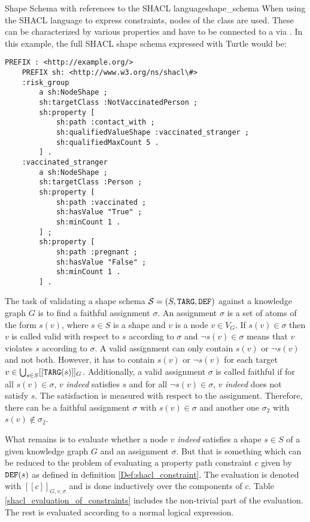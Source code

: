 \begin{Bsp}{Shape Schema with references to the SHACL language}{shape_schema}
When using the SHACL language to express constraints, nodes of the class  are used. These can be characterized by various properties and have to be connected to a  via . In this example, the full SHACL shape schema expressed with Turtle would be:
    \lstset{language=html}
    \begin{lstlisting}[captionpos=b, caption=The Example SHACL Shape Schema Serialized with Turtle , basicstyle=\ttfamily, frame=single]
    PREFIX : <http://example.org/>
    PREFIX sh: <http://www.w3.org/ns/shacl\#>
    :risk_group
        a sh:NodeShape ;
        sh:targetClass :NotVaccinatedPerson ;
        sh:property [
            sh:path :contact_with ;
            sh:qualifiedValueShape :vaccinated_stranger ;
            sh:qualifiedMaxCount 5 .
        ] .
    :vaccinated_stranger
        a sh:NodeShape ;
        sh:targetClass :Person ;
        sh:property [
            sh:path :vaccinated ;
            sh:hasValue "True" ;
            sh:minCount 1 .
        ] ;
        sh:property [
            sh:path :pregnant ;
            sh:hasValue "False" ;
            sh:minCount 1 .
        ] .
    \end{lstlisting}
\end{Bsp}

The task of validating a shape schema $\mathcal{S} = (S, \texttt{TARG}, \texttt{DEF})$ against a knowledge graph $G$ is to find a faithful assignment $\sigma$. An assignment $\sigma$ is a set of atoms of the form $s(v)$, where $s \in S$ is a shape and $v$ is a node $v \in V_G$. If $s(v) \in \sigma$ then $v$ is called valid with respect to $s$ according to $\sigma$ and $\neg s(v) \in \sigma$ means that $v$ violates $s$ according to $\sigma$. A valid assignment can only contain $s(v)$ or $\neg s(v)$ and not both. However, it has to contain $s(v)$ or $\neg s(v)$ for each target $v \in \bigcup_{s \in S} [[\texttt{TARG}(s)]]_G$. Additionally, a valid assignment $\sigma$ is called faithful if for all $s(v) \in \sigma$, $v$ \emph{indeed} satisfies $s$ and for all $\neg s(v) \in \sigma$, $v$ \emph{indeed} does not satisfy $s$. The satisfaction is measured with respect to the assignment. Therefore, there can be a faithful assignment $\sigma$ with $s(v) \in \sigma$ and another one $\sigma_2$ with $s(v) \not\in \sigma_2$. \cite{corman2018semantics}

What remains is to evaluate whether a node $v$ \emph{indeed} satisfies a shape $s \in S$ of a given knowledge graph $G$ and an assignment $\sigma$. But that is something which can be reduced to the problem of evaluating a property path constraint $c$ given by $\texttt{DEF}(s)$ as defined in definition \ref{Def:shacl_constraint}. The evaluation is denoted with $[[c]]_{G,v,\sigma}$ and is done inductively over the components of $c$. Table \ref{shacl_evaluation_of_constraints} includes the non-trivial part of the evaluation. The rest is evaluated according to a normal logical expression.

